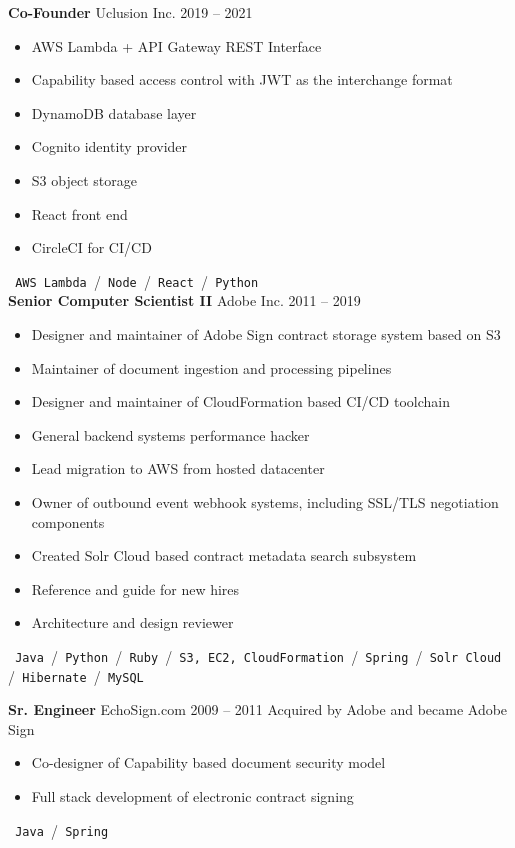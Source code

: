 \documentclass{res}
\begin{document}
        {\bf Co-Founder} \hfill Uclusion Inc. \hfill 2019 -- 2021
        \begin{itemize}
        \item AWS Lambda + API Gateway REST Interface
        \item Capability based access control with JWT as the interchange format
        \item DynamoDB database layer
        \item Cognito identity provider
        \item S3 object storage
        \item React front end
        \item CircleCI for CI/CD
        \end{itemize}
        \texttt{ AWS Lambda }\slash\texttt{ Node }\slash\texttt{ React }\slash\texttt{ Python }\\
        
        {\bf Senior Computer Scientist II} \hfill Adobe Inc. \hfill 2011 -- 2019
        \begin{itemize}
        \item Designer and maintainer of Adobe Sign contract storage system based on S3
        \item Maintainer of document ingestion and processing pipelines
        \item Designer and maintainer of CloudFormation based CI/CD toolchain
        \item General backend systems performance hacker
        \item Lead migration to AWS from hosted datacenter
        \item Owner of outbound event webhook systems, including SSL/TLS negotiation components
        \item Created Solr Cloud based contract metadata search subsystem
        \item Reference and guide for new hires
        \item Architecture and design reviewer
        \end{itemize}
	\texttt{ Java }\slash\texttt{ Python }\slash\texttt{ Ruby }\slash\texttt{ S3, EC2, CloudFormation }\slash\texttt{ Spring }\slash\texttt{ Solr Cloud }\slash\texttt{ Hibernate }\slash\texttt{ MySQL }
        

        {\bf Sr. Engineer} \hfill EchoSign.com 2009 -- 2011
        Acquired by Adobe and became Adobe Sign
        \begin{itemize}
        \item Co-designer of Capability based document security model
        \item Full stack development of electronic contract signing
        \end{itemize}
	\texttt{ Java }\slash\texttt{ Spring }
        
\end{document}
